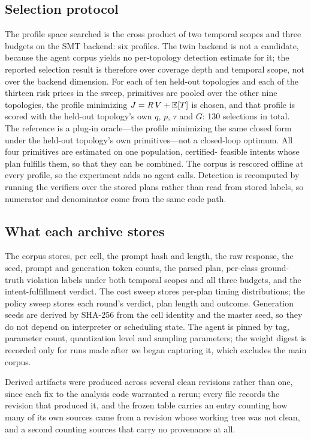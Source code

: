 \subsection{Selection protocol}

The profile space searched is the cross product of two temporal scopes and
three budgets on the SMT backend: six profiles. The twin backend is not a
candidate, because the agent corpus yields no per-topology detection estimate
for it; the reported selection result is therefore over coverage depth and
temporal scope, not over the backend dimension. For each of ten held-out
topologies and each of the thirteen risk prices in the sweep, primitives are
pooled over the other nine topologies, the profile minimizing
\(J=R\,V+\mathbb{E}[T]\) is chosen, and that profile is scored with the held-out
topology's own \(q\), \(p\), \(\tau\) and \(G\): 130 selections in total.
The reference is a plug-in oracle---the profile minimizing the same closed
form under the held-out topology's own primitives---not a closed-loop
optimum. All four primitives are estimated on one population, certified-%
feasible intents whose plan fulfills them, so that they can be combined. The
corpus is rescored offline at every profile, so the experiment adds no agent
calls. Detection is recomputed by running the verifiers over the stored plans
rather than read from stored labels, so numerator and denominator come from
the same code path.

\subsection{What each archive stores}

The corpus stores, per cell, the prompt hash and length, the raw response,
the seed, prompt and generation token counts, the parsed plan, per-class
ground-truth violation labels under both temporal scopes and all three
budgets, and the intent-fulfillment verdict.  The cost sweep stores per-plan
timing distributions; the policy sweep stores each round's verdict, plan
length and outcome.  Generation seeds are derived by SHA-256 from the cell
identity and the master seed, so they do not depend on interpreter or
scheduling state.  The agent is pinned by tag, parameter count, quantization
level and sampling parameters; the weight digest is recorded only for runs
made after we began capturing it, which excludes the main corpus.

Derived artifacts were produced across several clean revisions rather than
one, since each fix to the analysis code warranted a rerun; every file
records the revision that produced it, and the frozen table carries an entry
counting how many of its own sources came from a revision whose working tree
was not clean, and a second counting sources that carry no provenance at all.


